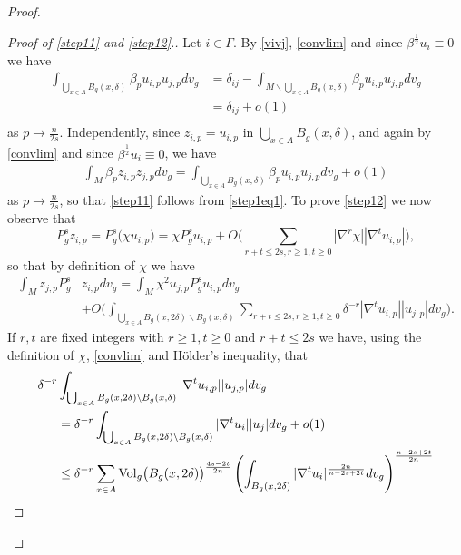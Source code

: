 \documentclass[10pt]{amsart}
\numberwithin{equation}{section}
\def\Vol{{\mathop{\rm Vol}}}
\theoremstyle{plain}
\theoremstyle{remark}
\begin{document}
\begin{proof}
\begin{proof}[Proof of \eqref{step11} and \eqref{step12}.]
Let $i \in \Gamma$. By \eqref{vivj}, \eqref{convlim} and since $\beta^{\frac12} u_i \equiv 0$ we have 
\begin{equation} \label{step1eq1}
\begin{aligned}
\int_{\bigcup_{x \in A} B_g(x,\delta)} \beta_p u_{i,p} u_{j,p} dv_g  & = \delta_{ij} - \int_{M \backslash \bigcup_{x \in A} B_g(x,\delta)} \beta_p u_{i,p} u_{j,p} dv_g \\
& = \delta_{ij}   + o(1) \\
\end{aligned}
\end{equation}
as $p \to \frac{n}{2s}$. Independently, since $z_{i,p} = u_{i,p}$ in $ \bigcup_{x \in A} B_g(x, \delta)$, and again by \eqref{convlim} and since $\beta^{\frac12} u_i \equiv 0$, we have
$$ \begin{aligned}
\int_M \beta_p z_{i,p} z_{j,p} dv_g = \int_{\bigcup_{x \in A} B_g(x, \delta)} \beta_p u_{i,p} u_{j,p} dv_g + o(1) 
\end{aligned} $$
as $p \to \frac{n}{2s}$, so that \eqref{step11} follows from \eqref{step1eq1}. To prove \eqref{step12} we now observe that 
$$ P_g^s z_{i,p} = P_g^s \big( \chi u_{i,p} \big) = \chi P_g^s u_{i,p} +  O \big( \sum_{r+t \le 2s, r \ge 1, t \ge 0} |\nabla ^r \chi| |\nabla^t u_{i,p}| \big), $$
so that by definition of $\chi$ we have 
\begin{equation} \label{step1eq2}
\begin{aligned}
 \int_M z_{j,p} P_g^s & z_{i,p}  dv_g  = \int_M \chi^2 u_{j,p}  P_g^s u_{i,p} dv_g \\
 & + O \Big(\int_{ \bigcup_{x \in A}B_g(x,2\delta) \backslash B_g(x, \delta)}  \sum_{r+t \le 2s, r \ge 1, t \ge 0} \delta^{-r} |\nabla^t u_{i,p}| |u_{j,p}| dv_g \Big). 
\end{aligned} 
 \end{equation}
If $r,t$ are fixed integers with $r \ge1, t \ge 0$ and $r+t \le 2s$ we have, using the definition of $\chi$,  \eqref{convlim} and H\"older's inequality, that 
$$ \begin{aligned}
\delta^{-r}& \int_{ \bigcup_{x \in A}B_g(x,2\delta) \backslash B_g(x, \delta)}  |\nabla^t u_{i,p}| |u_{j,p}| dv_g \\
& = \delta^{-r} \int_{ \bigcup_{x \in A}B_g(x,2\delta) \backslash B_g(x, \delta)}|\nabla^t u_{i}| |u_{j}| dv_g + o(1) \\
& \le \delta^{-r}\sum_{x \in A}   \Vol_g \big(B_g(x, 2\delta)\big)^{\frac{4s - 2t}{2n}} \left(\int_{B_g(x,2\delta)} |\nabla^t  u_{i}|^{\frac{2n}{n-2s + 2t}} dv_g \right)^{\frac{n-2s+2t}{2n}} \\

\end{aligned}$$
\end{proof}
\end{proof}
\end{document}
